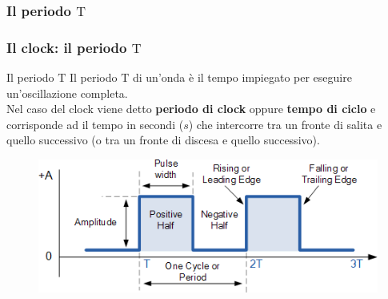 \subsubsection[Il periodo $\mathrm{T}$]{Il periodo $\mathrm{T}$}
\begin{frame}
	\frametitle{Il clock: il periodo $\mathrm{T}$}
	
	\begin{block}{Il periodo $\mathrm{T}$}
		Il periodo $\mathrm{T}$ di un'onda è il tempo impiegato per eseguire un'oscillazione completa.\\
		Nel caso del clock viene detto \textbf{periodo di clock} oppure \textbf{tempo di ciclo} e corrisponde ad il tempo in secondi ($s$) che intercorre tra un fronte di salita e quello successivo (o tra un fronte di discesa e quello successivo).
	\end{block}
	
	\begin{figure}[!htbp]
		\centering 
		\includegraphics[width=0.78\linewidth]{images/2_elettronica/clock.png}
	\end{figure}
	
\end{frame}


